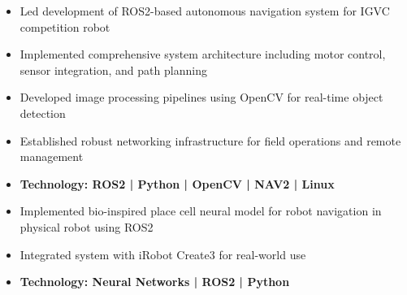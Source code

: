 \begin{itemize}
	\item Led development of ROS2-based autonomous navigation system for IGVC competition robot
	\item Implemented comprehensive system architecture including motor control, sensor integration, and path planning
	\item Developed image processing pipelines using OpenCV for real-time object detection
	\item Established robust networking infrastructure for field operations and remote management
	\item\bf{Technology}{: ROS2 | Python | OpenCV | NAV2 | Linux}
\end{itemize}
\smallskip

\begin{itemize}
	\item Implemented bio-inspired place cell neural model for robot navigation in physical robot using ROS2
	\item Integrated system with iRobot Create3 for real-world use
	\item\bf{Technology}{: Neural Networks | ROS2 | Python}
\end{itemize}

